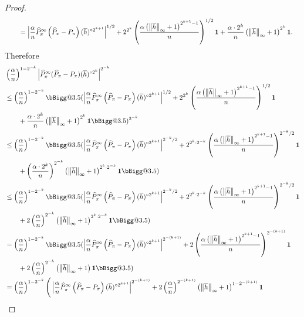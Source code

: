 \documentclass{article}
\makeatletter
\newcommand{\Biggg}{\bBigg@{3.5}}
\theoremstyle{plain}
\theoremstyle{plain}
\theoremstyle{remark}
\theoremstyle{plain}
\theoremstyle{plain}
\newcommand{\Phat}{\widehat{P}}
\newcommand{\one}{\mathbf{1}}
\newcommand{\hc}{\overline{h}}
\makeatother
\begin{document}
\begin{proof}
\begin{align*}
    & \quad \quad =  \left| \frac{\alpha}{n} \Phat_\pi^\infty \left(\Phat_\pi - P_\pi \right) (\hc)^{\circ 2^{k+1} } \right|^{1/2} + 2^{2^k} \left(\frac{\alpha \left(\infnorm{\hc} + 1\right)^{2^{k+1}-1}}{n} \right)^{1/2}\one  + \frac{\alpha \cdot 2^k  }{n}\left(\infnorm{\hc} + 1 \right)^{2^k} \one.
\end{align*}
Therefore
\begin{align*}
    &\left(\frac{\alpha}{n}\right)^{1-2^{-k}} \left|\Phat_\pi^\infty (\Phat_\pi - P_\pi) (\hc)^{\circ 2^k} \right|^{2^{-k}} \\
    &\leq \left(\frac{\alpha}{n}\right)^{1-2^{-k}} \Biggg( \left| \frac{\alpha}{n} \Phat_\pi^\infty \left(\Phat_\pi - P_\pi \right) (\hc)^{\circ 2^{k+1} } \right|^{1/2} + 2^{2^k} \left(\frac{\alpha \left(\infnorm{\hc} + 1\right)^{2^{k+1}-1}}{n} \right)^{1/2}\one\\
    & \quad \quad + \frac{\alpha \cdot 2^k  }{n}\left(\infnorm{\hc} + 1 \right)^{2^k} \one   \Biggg)^{2^{-k}} \\
    &\leq \left(\frac{\alpha}{n}\right)^{1-2^{-k}} \Biggg( \left| \frac{\alpha}{n} \Phat_\pi^\infty \left(\Phat_\pi - P_\pi \right) (\hc)^{\circ 2^{k+1} } \right|^{2^{-k}/2} + 2^{{2^k}\cdot 2^{-k}} \left(\frac{\alpha \left(\infnorm{\hc} + 1\right)^{2^{k+1}-1}}{n} \right)^{2^{-k}/2}\one \\
    &\quad \quad + \left(\frac{\alpha \cdot 2^k  }{n}\right)^{2^{-k}}\left(\infnorm{\hc} + 1 \right)^{2^k \cdot 2^{-k}} \one   \Biggg) \\
    &\leq \left(\frac{\alpha}{n}\right)^{1-2^{-k}} \Biggg( \left| \frac{\alpha}{n} \Phat_\pi^\infty \left(\Phat_\pi - P_\pi \right) (\hc)^{\circ 2^{k+1} } \right|^{2^{-k}/2} + 2^{{2^k}\cdot 2^{-k}} \left(\frac{\alpha \left(\infnorm{\hc} + 1\right)^{2^{k+1}-1}}{n} \right)^{2^{-k}/2}\one \\
    & \quad \quad + 2\left(\frac{\alpha   }{n}\right)^{2^{-k}}\left(\infnorm{\hc} + 1 \right)^{2^k \cdot 2^{-k}} \one   \Biggg) \\
    &= \left(\frac{\alpha}{n}\right)^{1-2^{-k}} \Biggg( \left| \frac{\alpha}{n} \Phat_\pi^\infty \left(\Phat_\pi - P_\pi \right) (\hc)^{\circ 2^{k+1} } \right|^{2^{-(k+1)}} + 2 \left(\frac{\alpha \left(\infnorm{\hc} + 1\right)^{2^{k+1}-1}}{n} \right)^{2^{-(k+1)}}\one\\
    &\quad \quad + 2\left(\frac{\alpha   }{n}\right)^{2^{-k}}\left(\infnorm{\hc} + 1 \right) \one   \Biggg) \\
    &= \left(\frac{\alpha}{n}\right)^{1-2^{-k}} \Bigg( \left| \frac{\alpha}{n} \Phat_\pi^\infty \left(\Phat_\pi - P_\pi \right) (\hc)^{\circ 2^{k+1} } \right|^{2^{-(k+1)}} + 2 \left(\frac{\alpha}{n} \right)^{2^{-(k+1)}} \left(\infnorm{\hc} + 1\right)^{1 - 2^{-(k+1)}}\one\\

\end{align*}
\end{proof}
\end{document}
